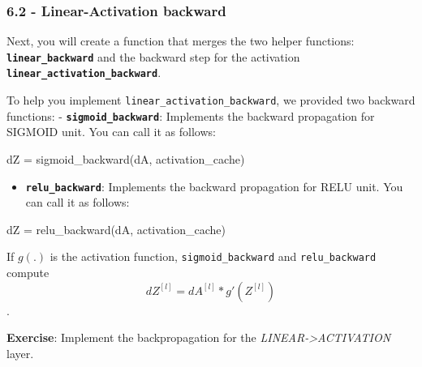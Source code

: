 \documentclass[11pt]{article}
\newenvironment{Shaded}{}{}
\newcommand{\NormalTok}[1]{{#1}}
\begin{document}
    \subsubsection{6.2 - Linear-Activation
backward}\label{linear-activation-backward}

Next, you will create a function that merges the two helper functions:
\textbf{\texttt{linear\_backward}} and the backward step for the
activation \textbf{\texttt{linear\_activation\_backward}}.

To help you implement \texttt{linear\_activation\_backward}, we provided
two backward functions: - \textbf{\texttt{sigmoid\_backward}}:
Implements the backward propagation for SIGMOID unit. You can call it as
follows:

\begin{Shaded}
\begin{Highlighting}[]
\NormalTok{dZ = sigmoid_backward(dA, activation_cache)}
\end{Highlighting}
\end{Shaded}

\begin{itemize}
\itemsep1pt\parskip0pt
\item
  \textbf{\texttt{relu\_backward}}: Implements the backward propagation
  for RELU unit. You can call it as follows:
\end{itemize}

\begin{Shaded}
\begin{Highlighting}[]
\NormalTok{dZ = relu_backward(dA, activation_cache)}
\end{Highlighting}
\end{Shaded}

If $g(.)$ is the activation function, \texttt{sigmoid\_backward} and
\texttt{relu\_backward} compute
\[dZ^{[l]} = dA^{[l]} * g'(Z^{[l]}) \tag{11}\].

\textbf{Exercise}: Implement the backpropagation for the
\emph{LINEAR-\textgreater{}ACTIVATION} layer.
\end{document}
